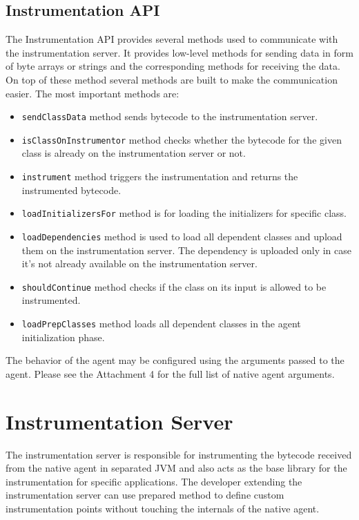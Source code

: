 \subsection{Instrumentation API}
The Instrumentation API provides several methods used to communicate with the instrumentation server. It provides low-level methods for sending data in form of byte arrays or strings and the corresponding methods for receiving the data. On top of these method several methods are built to make the communication easier. The most important methods are:
\begin{itemize}
	\item \texttt{sendClassData} method sends bytecode to the instrumentation server.
	\item \texttt{isClassOnInstrumentor} method checks whether the bytecode for the given class is already on the instrumentation server or not.
	\item \texttt{instrument} method triggers the instrumentation and returns the instrumented bytecode.
	\item \texttt{loadInitializersFor} method is for loading the initializers for specific class.
	\item \texttt{loadDependencies} method is used to load all dependent classes and upload them on the instrumentation server. The dependency is uploaded only in case it's not already available on the instrumentation server.
	\item \texttt{shouldContinue} method checks if the class on its input is allowed to be instrumented.
	\item \texttt{loadPrepClasses} method loads all dependent classes in the agent initialization phase.
\end{itemize}

The behavior of the agent may be configured using the arguments passed to the agent. Please see the Attachment 4 for the full list of native agent arguments.

\section{Instrumentation Server}
\label{sec:inst_server}
The instrumentation server is responsible for instrumenting the bytecode received from the native agent in separated JVM and also acts as the base library for the instrumentation for specific applications. The developer extending the instrumentation server can use prepared method to define custom instrumentation points without touching the internals of the native agent.

